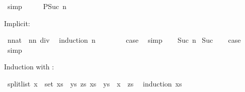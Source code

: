 \begin{isabellebody}
\ simp\isanewline
\ \ \isamarkupfalse%
\ \isamarkupfalse%
\ {\isachardoublequoteopen}{\isacharquery}{\kern0pt}P{\isacharparenleft}{\kern0pt}Suc\ n{\isacharparenright}{\kern0pt}{\isachardoublequoteclose}\ \isacommand{{\isachardot}{\kern0pt}}\isamarkupfalse%
\isanewline
{}\isamarkupfalse%
%
\endisatagproof
{\isafoldproof}%
%
\isadelimproof
%
\endisadelimproof
%
\begin{isamarkuptext}%
Implicit:%
\end{isamarkuptext}\isamarkuptrue%
\isamarkupfalse%
\ {\isachardoublequoteopen}{\isasymSum}{\isacharbraceleft}{\kern0pt}{}{\isachardot}{\kern0pt}{\isachardot}{\kern0pt}n{\isacharcolon}{\kern0pt}{\isacharcolon}{\kern0pt}nat{\isacharbraceright}{\kern0pt}\ {\isacharequal}{\kern0pt}\ n{\isacharasterisk}{\kern0pt}{\isacharparenleft}{\kern0pt}n{\isacharplus}{\kern0pt}{}{\isacharparenright}{\kern0pt}\ div\ {}{\isachardoublequoteclose}\isanewline
%
\isadelimproof
%
\endisadelimproof
%
\isatagproof
{}\isamarkupfalse%
\ {\isacharparenleft}{\kern0pt}induction\ n{\isacharparenright}{\kern0pt}\isanewline
{}\isamarkupfalse%
\isanewline
\ \ \isamarkupfalse%
\ {}\isanewline
\ \ \isamarkupfalse%
\ {\isacharquery}{\kern0pt}case\ \isamarkupfalse%
\ simp\isanewline
{}\isamarkupfalse%
\isanewline
\ \ \isamarkupfalse%
\ {\isacharparenleft}{\kern0pt}Suc\ n{\isacharparenright}{\kern0pt}\isanewline
{}\isamarkupfalse%
\ Suc\isanewline
\ \ \isamarkupfalse%
\ {\isacharquery}{\kern0pt}case\ \isamarkupfalse%
\ simp\isanewline
{}\isamarkupfalse%
%
\endisatagproof
{\isafoldproof}%
%
\isadelimproof
%
\endisadelimproof
%
\begin{isamarkuptext}%
Induction with \isa{{\isasymLongrightarrow}}:%
\end{isamarkuptext}\isamarkuptrue%
\isamarkupfalse%
\ split{\isacharunderscore}{\kern0pt}list{\isacharcolon}{\kern0pt}\ {\isachardoublequoteopen}x\ {\isacharcolon}{\kern0pt}\ set\ xs\ {\isasymLongrightarrow}\ {\isasymexists}ys\ zs{\isachardot}{\kern0pt}\ xs\ {\isacharequal}{\kern0pt}\ ys\ {\isacharat}{\kern0pt}\ x\ {\isacharhash}{\kern0pt}\ zs{\isachardoublequoteclose}\ \isanewline
%
\isadelimproof
%
\endisadelimproof
%
\isatagproof
{}\isamarkupfalse%
\ {\isacharparenleft}{\kern0pt}induction\ xs{\isacharparenright}{\kern0pt}\isanewline

\end{isabellebody}

